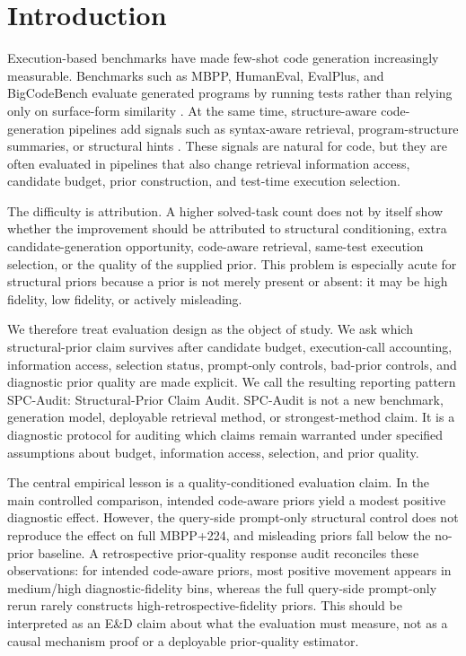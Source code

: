 \documentclass{article}
\begin{document}
\section{Introduction}
Execution-based benchmarks have made few-shot code generation increasingly measurable. Benchmarks such as MBPP, HumanEval, EvalPlus, and BigCodeBench evaluate generated programs by running tests rather than relying only on surface-form similarity \citep{austin2021program,chen2021evaluating,liu2023evalplus,zhuo2024bigcodebench}. At the same time, structure-aware code-generation pipelines add signals such as syntax-aware retrieval, program-structure summaries, or structural hints \citep{zhang2023syntax,tipirneni2022structcoder}. These signals are natural for code, but they are often evaluated in pipelines that also change retrieval information access, candidate budget, prior construction, and test-time execution selection.

The difficulty is attribution. A higher solved-task count does not by itself show whether the improvement should be attributed to structural conditioning, extra candidate-generation opportunity, code-aware retrieval, same-test execution selection, or the quality of the supplied prior. This problem is especially acute for structural priors because a prior is not merely present or absent: it may be high fidelity, low fidelity, or actively misleading.

We therefore treat evaluation design as the object of study. We ask which structural-prior claim survives after candidate budget, execution-call accounting, information access, selection status, prompt-only controls, bad-prior controls, and diagnostic prior quality are made explicit. We call the resulting reporting pattern SPC-Audit: Structural-Prior Claim Audit. SPC-Audit is not a new benchmark, generation model, deployable retrieval method, or strongest-method claim. It is a diagnostic protocol for auditing which claims remain warranted under specified assumptions about budget, information access, selection, and prior quality.

The central empirical lesson is a quality-conditioned evaluation claim. In the main controlled comparison, intended code-aware priors yield a modest positive diagnostic effect. However, the query-side prompt-only structural control does not reproduce the effect on full MBPP+224, and misleading priors fall below the no-prior baseline. A retrospective prior-quality response audit reconciles these observations: for intended code-aware priors, most positive movement appears in medium/high diagnostic-fidelity bins, whereas the full query-side prompt-only rerun rarely constructs high-retrospective-fidelity priors. This should be interpreted as an E\&D claim about what the evaluation must measure, not as a causal mechanism proof or a deployable prior-quality estimator.
\end{document}

